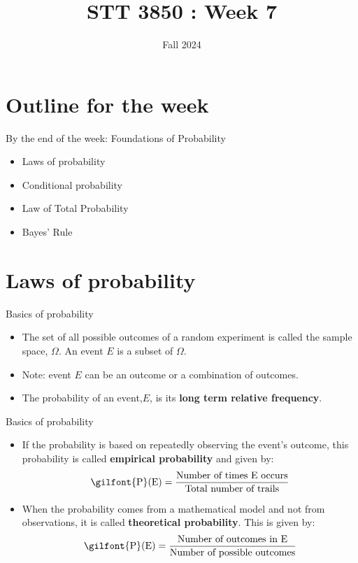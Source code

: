 \documentclass[
  ignorenonframetext,
]{beamer}
\title{STT 3850 : Week 7}
\author{Fall 2024}
\date{}
\institute{Appalachian State University}
\providecommand{\tightlist}{%
  \setlength{\itemsep}{0pt}\setlength{\parskip}{0pt}}
\begin{document}
\frame{\titlepage}

\hypertarget{outline-for-the-week}{%
\section{Outline for the week}\label{outline-for-the-week}}

\begin{frame}{By the end of the week: Foundations of Probability}
\protect\hypertarget{by-the-end-of-the-week-foundations-of-probability}{}
\begin{itemize}
\tightlist
\item
  Laws of probability
\item
  Conditional probability
\item
  Law of Total Probability
\item
  Bayes' Rule
\end{itemize}
\end{frame}

\hypertarget{laws-of-probability}{%
\section{Laws of probability}\label{laws-of-probability}}

\begin{frame}{Basics of probability}
\protect\hypertarget{basics-of-probability}{}
\begin{itemize}
\item
  The set of all possible outcomes of a random experiment is called the
  sample space, \(\Omega\). An event \(E\) is a subset of \(\Omega\).
\item
  Note: event \(E\) can be an outcome or a combination of outcomes.
\item
  The probability of an event,\(E\), is its \textbf{long term relative
  frequency}.
\end{itemize}
\end{frame}

\begin{frame}{Basics of probability}
\protect\hypertarget{basics-of-probability-1}{}
\begin{itemize}
\tightlist
\item
  If the probability is based on repeatedly observing the event's
  outcome, this probability is called \textbf{empirical probability} and
  given by:
  \[\textrm{\gilfont{P}}\normalfont (\text{E})=\frac{\text{Number of times E occurs}}{\text{Total number of trails}}\]
\item
  When the probability comes from a mathematical model and not from
  observations, it is called \textbf{theoretical probability}. This is
  given by:
  \[\textrm{\gilfont{P}}\normalfont (\text{E})=\frac{\text{Number of outcomes in E}}{\text{Number of possible outcomes}}\]
\end{itemize}
\end{frame}
\end{document}
